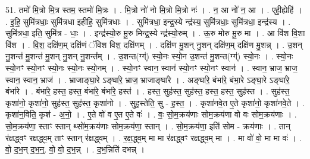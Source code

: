 \documentclass[17pt]{extarticle}
\begin{document}
51. तमो॑ मि॒त्रो मि॒त्र स्तम॒ स्तमो॑ मि॒त्रः । . मि॒त्रो नो॑ नो मि॒त्रो मि॒त्रो नः॑ । . न॒ आ नो॑ न॒ आ । . एही॒ह्येहि॑ । . इ॒हि॒ सुमि॑त्रधाः॒ सुमि॑त्रधा इहीहि॒ सुमि॑त्रधाः । . सुमि॑त्रधा॒ इन्द्र॒स्ये न्द्र॑स्य॒ सुमि॑त्रधाः॒ सुमि॑त्रधा॒ इन्द्र॑स्य । . सुमि॑त्रधा॒ इति॒ सुमि॑त्र - धाः॒ । . इन्द्र॑स्यो॒रु मू॒रु मिन्द्र॒स्ये न्द्र॑स्यो॒रुम् । . ऊ॒रु मोरु मू॒रु मा । . आ वि॑श वि॒शा वि॑श । . वि॒श॒ दक्षि॑ण॒म् दक्षि॑णं ॅविश विश॒ दक्षि॑णम् । . दक्षि॑ण मु॒शन् नु॒शन् दक्षि॑ण॒म् दक्षि॑ण मु॒शन्न् । . उ॒शन् नु॒शन्त॑ मु॒शन्त॑ मु॒शन् नु॒शन् नु॒शन्त᳚म् । . उ॒शन्त(ग्ग्॑) स्यो॒नः स्यो॒न उ॒शन्त॑ मु॒शन्त(ग्ग्॑) स्यो॒नः । . स्यो॒नः स्यो॒नꣳ स्यो॒नꣳ स्यो॒नः स्यो॒नः स्यो॒नम् । . स्यो॒नꣳ स्वान॒ स्वान॑ स्यो॒नꣳ स्यो॒नꣳ स्वान॑ । . स्वान॒ भ्राज॒ भ्राज॒ स्वान॒ स्वान॒ भ्राज॑ । . भ्राजाङ्घा॒रे ऽङ्घा॑रे॒ भ्राज॒ भ्राजाङ्घा॑रे । . अङ्घा॑रे॒ बंभा॑रे॒ बंभा॒रे ऽङ्घा॒रे ऽङ्घा॑रे॒ बंभा॑रे । . बंभा॑रे॒ हस्त॒ हस्त॒ बंभा॑रे॒ बंभा॑रे॒ हस्त॑ । . हस्त॒ सुह॑स्त॒ सुह॑स्त॒ हस्त॒ हस्त॒ सुह॑स्त । . सुह॑स्त॒ कृशा॑नो॒ कृशा॑नो॒ सुह॑स्त॒ सुह॑स्त॒ कृशा॑नो । . सुह॒स्तेति॒ सु - ह॒स्त॒ । . कृशा॑नवे॒त ए॒ते कृशा॑नो॒ कृशा॑नवे॒ते । . कृशा॑न॒विति॒ कृश॑ - अ॒नो॒ । . ए॒ते वो॑ व ए॒त ए॒ते वः॑ । . वः॒ सो॒म॒क्रय॑णाः सोम॒क्रय॑णा वो वः सोम॒क्रय॑णाः । . सो॒म॒क्रय॑णा॒ स्ताꣳ स्तान् थ्सो॑म॒क्रय॑णाः सोम॒क्रय॑णा॒ स्तान् । . सो॒म॒क्रय॑णा॒ इति॑ सोम - क्रय॑णाः । . तान् र॑क्षद्ध्वꣳ रक्षद्ध्व॒म् ताꣳ स्तान् र॑क्षद्ध्वम् । . र॒क्ष॒द्ध्व॒म् मा मा र॑क्षद्ध्वꣳ रक्षद्ध्व॒म् मा । . मा वो॑ वो॒ मा मा वः॑ । . वो॒ द॒भ॒न् द॒भ॒न्॒. वो॒ वो॒ द॒भ॒न्न् । . द॒भ॒न्निति॑ दभन्न् । \newline
\end{document}
